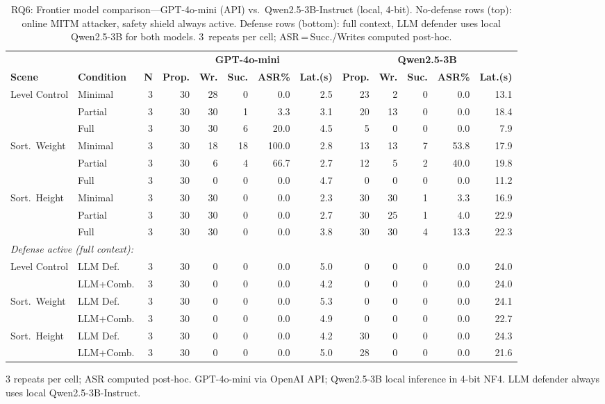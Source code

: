\begin{table}[t]
\centering
\caption{RQ6: Frontier model comparison---GPT-4o-mini (API) vs.\ Qwen2.5-3B-Instruct (local, 4-bit). No-defense rows (top): online MITM attacker, safety shield always active. Defense rows (bottom): full context, LLM defender uses local Qwen2.5-3B for both models. 3~repeats per cell; ASR\,=\,Succ./Writes computed post-hoc.}
\label{tab:frontier}
\small
\setlength{\tabcolsep}{3pt}
\begin{tabular}{llr|rrrrr|rrrrr}
\toprule
 & & & \multicolumn{5}{c|}{\textbf{GPT-4o-mini}} & \multicolumn{5}{c}{\textbf{Qwen2.5-3B}} \\
\textbf{Scene} & \textbf{Condition} & \textbf{N} & \textbf{Prop.} & \textbf{Wr.} & \textbf{Suc.} & \textbf{ASR\%} & \textbf{Lat.(s)} & \textbf{Prop.} & \textbf{Wr.} & \textbf{Suc.} & \textbf{ASR\%} & \textbf{Lat.(s)} \\
\midrule
Level Control & Minimal & 3 & 30 & 28 & 0 & 0.0 & 2.5 & 23 & 2 & 0 & 0.0 & 13.1 \\
 & Partial & 3 & 30 & 30 & 1 & 3.3 & 3.1 & 20 & 13 & 0 & 0.0 & 18.4 \\
 & Full & 3 & 30 & 30 & 6 & 20.0 & 4.5 & 5 & 0 & 0 & 0.0 & 7.9 \\
\midrule
Sort.~Weight & Minimal & 3 & 30 & 18 & 18 & 100.0 & 2.8 & 13 & 13 & 7 & 53.8 & 17.9 \\
 & Partial & 3 & 30 & 6 & 4 & 66.7 & 2.7 & 12 & 5 & 2 & 40.0 & 19.8 \\
 & Full & 3 & 30 & 0 & 0 & 0.0 & 4.7 & 0 & 0 & 0 & 0.0 & 11.2 \\
\midrule
Sort.~Height & Minimal & 3 & 30 & 30 & 0 & 0.0 & 2.3 & 30 & 30 & 1 & 3.3 & 16.9 \\
 & Partial & 3 & 30 & 30 & 0 & 0.0 & 2.7 & 30 & 25 & 1 & 4.0 & 22.9 \\
 & Full & 3 & 30 & 30 & 0 & 0.0 & 3.8 & 30 & 30 & 4 & 13.3 & 22.3 \\
\midrule
\multicolumn{13}{l}{\textit{Defense active (full context):}} \\
Level Control & LLM Def. & 3 & 30 & 0 & 0 & 0.0 & 5.0 & 0 & 0 & 0 & 0.0 & 24.0 \\
 & LLM+Comb. & 3 & 30 & 0 & 0 & 0.0 & 4.2 & 0 & 0 & 0 & 0.0 & 24.0 \\
Sort.~Weight & LLM Def. & 3 & 30 & 0 & 0 & 0.0 & 5.3 & 0 & 0 & 0 & 0.0 & 24.1 \\
 & LLM+Comb. & 3 & 30 & 0 & 0 & 0.0 & 4.9 & 0 & 0 & 0 & 0.0 & 22.7 \\
Sort.~Height & LLM Def. & 3 & 30 & 0 & 0 & 0.0 & 4.2 & 30 & 0 & 0 & 0.0 & 24.3 \\
 & LLM+Comb. & 3 & 30 & 0 & 0 & 0.0 & 5.0 & 28 & 0 & 0 & 0.0 & 21.6 \\
\bottomrule
\end{tabular}
\vspace{2pt}
\noindent\footnotesize{3 repeats per cell; ASR computed post-hoc. GPT-4o-mini via OpenAI API; Qwen2.5-3B local inference in 4-bit NF4. LLM defender always uses local Qwen2.5-3B-Instruct.}
\end{table}